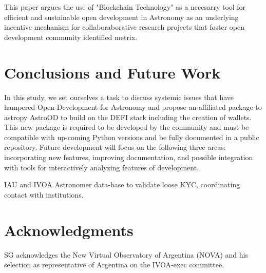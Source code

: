\documentclass[final,5p,times,twocolumn,authoryear]{elsarticle}
\begin{document}
       
This paper argues the use of "Blockchain Technology" as a necesarry tool for efficient and sustainable open development in Astronomy as an underlying incentive mechanism for collaboraborative research projects that foster open development community identified metrix.  


\section{Conclusions and Future Work}
\label{sec:5}
%
In this study, we set ourselves a task to discuss systemic issues that have hampered Open Development for Astronomy and propose an affiliated package to astropy AstroOD to build on the DEFI stack including the creation of wallets. This new package is required to be developed by the community and must be compatible with up-coming Python versions and be fully documented in a public repository. 
%
Future development will focus on the following three areas: incorporating
new features, improving documentation, and 
possible integration with tools for interactively analyzing features of development.

IAU and IVOA Astronomer data-base to validate loose KYC, coordinating contact with institutions. 

\section{Acknowledgments}
SG acknowledges the New Virtual Observatory of Argentina (NOVA) and his selection as representative of Argentina on the IVOA-exec committee.

%


\end{document}
